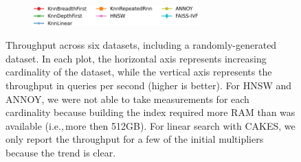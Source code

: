 \begin{figure}
\begin{subfigure}[b]{0.47\textwidth}
        \label{fig:results:radioml-scaling}
    \end{subfigure}%
    \\
    \begin{subfigure}[b]{0.94\textwidth}
        \centering
        \includegraphics[width=0.7\textwidth]{plots/legend.png}
        \label{fig:results:scaling-legend}
    \end{subfigure}%
    \caption{Throughput across six datasets, including a randomly-generated dataset.
    In each plot, the horizontal axis represents increasing cardinality of the dataset, while the vertical axis represents the throughput in queries per second (higher is better).
    For HNSW and ANNOY, we were not able to take measurements for each cardinality because building the index required more RAM than was available (i.e.,\,more then 512GB).
    For linear search with CAKES, we only report the throughput for a few of the initial multipliers because the trend is clear.}
    \label{fig:results:scaling-plots}
\end{figure}


